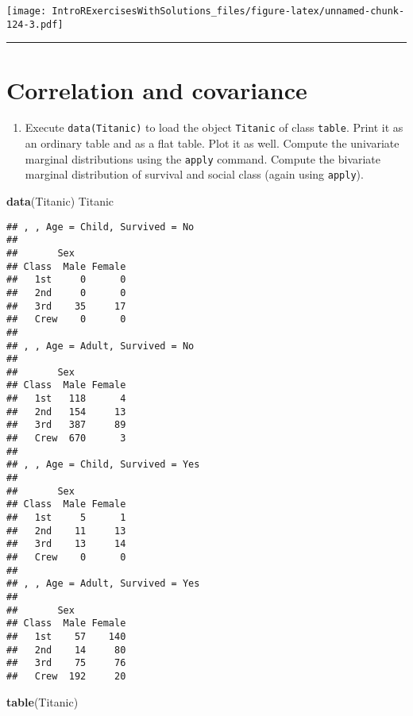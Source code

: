 \documentclass[]{article}
\newenvironment{Shaded}{\begin{snugshade}}{\end{snugshade}}
\newcommand{\KeywordTok}[1]{\textcolor[rgb]{0.13,0.29,0.53}{\textbf{#1}}}
\newcommand{\NormalTok}[1]{#1}
\providecommand{\tightlist}{%
  \setlength{\itemsep}{0pt}\setlength{\parskip}{0pt}}
\begin{document}
\texttt{[image: IntroRExercisesWithSolutions\_files/figure-latex/unnamed-chunk-124-3.pdf]}

\begin{center}\rule{0.5\linewidth}{\linethickness}\end{center}

\section{Correlation and covariance}\label{correlation-and-covariance}

\begin{enumerate}
\def\labelenumi{\arabic{enumi}.}
\tightlist
\item
  Execute \texttt{data(Titanic)} to load the object \texttt{Titanic} of
  class \texttt{table}. Print it as an ordinary table and as a flat
  table. Plot it as well. Compute the univariate marginal distributions
  using the \texttt{apply} command. Compute the bivariate marginal
  distribution of survival and social class (again using
  \texttt{apply}).
\end{enumerate}

\begin{Shaded}
\begin{Highlighting}[]
\KeywordTok{data}\NormalTok{(Titanic)}
\NormalTok{Titanic}
\end{Highlighting}
\end{Shaded}

\begin{verbatim}
## , , Age = Child, Survived = No
## 
##       Sex
## Class  Male Female
##   1st     0      0
##   2nd     0      0
##   3rd    35     17
##   Crew    0      0
## 
## , , Age = Adult, Survived = No
## 
##       Sex
## Class  Male Female
##   1st   118      4
##   2nd   154     13
##   3rd   387     89
##   Crew  670      3
## 
## , , Age = Child, Survived = Yes
## 
##       Sex
## Class  Male Female
##   1st     5      1
##   2nd    11     13
##   3rd    13     14
##   Crew    0      0
## 
## , , Age = Adult, Survived = Yes
## 
##       Sex
## Class  Male Female
##   1st    57    140
##   2nd    14     80
##   3rd    75     76
##   Crew  192     20
\end{verbatim}

\begin{Shaded}
\begin{Highlighting}[]
\KeywordTok{table}\NormalTok{(Titanic)}
\end{Highlighting}
\end{Shaded}
\end{document}
